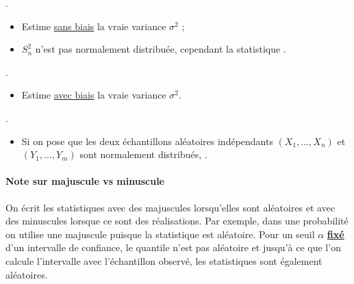\documentclass[10pt, french]{article}
\begin{document}
\begin{multicols*}{2}
\begin{definitionNOHFILLprop}
.

\begin{itemize}
	\item	Estime \underline{sans biais} la vraie variance $\sigma^{2}$ ;
	\item	$S^{2}_{n}$ n'est pas normalement distribuée, cependant la statistique .
\end{itemize}
\end{definitionNOHFILLprop}

\begin{definitionNOHFILLprop}
.

\begin{itemize}
	\item	Estime \underline{avec biais} la vraie variance $\sigma^{2}$.
\end{itemize}
\end{definitionNOHFILLprop}

\begin{definitionNOHFILLprop}[Statistique $F$]
.

\begin{itemize}
	\item	Si on pose que les deux échantillons aléatoires indépendants $(X_{1}, \dots, X_{n})$ et $(Y_{1}, \dots, Y_{m})$ sont normalement distribués, .
\end{itemize}
\end{definitionNOHFILLprop}

\paragraph{Note sur majuscule vs minuscule}	On écrit les statistiques avec des majuscules lorsqu'elles sont aléatoires et avec des minuscules lorsque ce sont des réalisations. Par exemple, dans une probabilité on utilise une majuscule puisque la statistique est aléatoire. 
Pour un seuil $\alpha$ \textbf{\underline{fixé}} d'un intervalle de confiance, le quantile n'est pas aléatoire et jusqu'à ce que l'on calcule l'intervalle avec l'échantillon observé, les statistiques sont également aléatoires. 


\end{multicols*}
\end{document}
